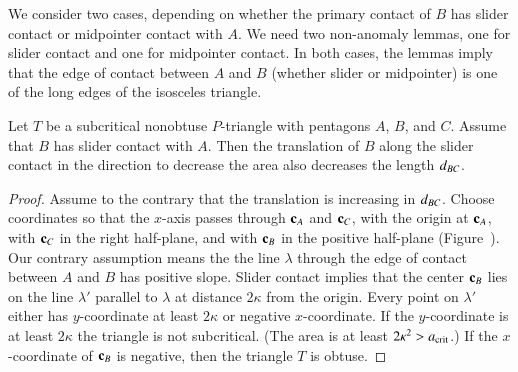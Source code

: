 We consider two cases, depending on whether the primary contact of $B$
has slider contact or midpointer contact with $A$.  We need two
non-anomaly lemmas, one for slider contact and one for midpointer
contact.  In both cases, the lemmas imply that the edge of contact
between $A$ and $B$ (whether slider or midpointer) is one of the long
edges of the isosceles triangle.

\begin{lemma}  
  Let $T$ be a subcritical nonobtuse $P$-triangle with pentagons $A$, $B$, and
  $C$.  Assume that $B$ has slider contact with $A$.  Then the
  translation of $B$ along the slider contact in the direction to
  decrease the area also decreases the length $d_{BC}$.
\end{lemma}

\begin{proof} 
  Assume to the contrary that the translation is increasing in
  $d_{BC}$.  Choose coordinates so that the $x$-axis passes through
  ${\mathbf c}_A$ and ${\mathbf c}_C$, with the origin at ${\mathbf c}_A$, with ${\mathbf c}_C$ in the
  right half-plane, and with ${\mathbf c}_B$ in the positive half-plane (Figure~).  Our
  contrary assumption means the the line $\lambda$ through the edge of
  contact between $A$ and $B$ has positive slope.  Slider contact
  implies that the center ${\mathbf c}_B$ lies on the line $\lambda'$ parallel
  to $\lambda$ at distance $2\kappa$ from the origin.  Every point on
  $\lambda'$ either has $y$-coordinate at least $2\kappa$ or negative
  $x$-coordinate.  If the $y$-coordinate is at least $2\kappa$ the
  triangle is not subcritical.  (The area is at least
  $2\kappa^2>a_\text{crit}$.) If the $x$-coordinate of ${\mathbf c}_B$ is negative, then
  the triangle $T$ is obtuse.
\end{proof}



